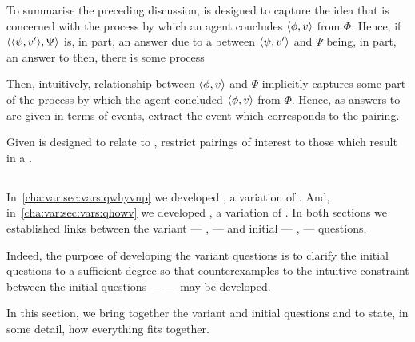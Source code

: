 \begin{note}
  To summarise the preceding discussion, \linkH{} is designed to capture the idea that \qHow{} is concerned with the process by which an agent concludes \(\langle \phi, v \rangle\) from \(\Phi\).
  Hence, if \(\langle \langle \psi, v' \rangle, \Psi \rangle\) is, in part, an answer \qHow{} due to a \ros{} between \(\langle \psi, v' \rangle\) and \(\Psi\) being, in part, an answer to \qWhyV{} then, there is some process 


  Then, intuitively, relationship between \(\langle \phi, v \rangle\) and \(\Psi\) implicitly captures some part of the process by which the agent concluded \(\langle \phi, v \rangle\) from \(\Phi\).
  Hence, as answers to \qHowV{} are given in terms of events, extract the event which corresponds to the pairing.

  Given \qHowV{} is designed to relate to \qWhyV{}, restrict pairings of interest to those which result in a .
\end{note}

\subsection{\issueConstraint{}}
\label{cha:var:sec:vars:issue}

\begin{note}
  In~\autoref{cha:var:sec:vars:qwhyvnp} we developed \qWhyV{}, a variation of \qWhy{}.
  And, in~\autoref{cha:var:sec:vars:qhowv} we developed \qHowV{}, a variation of \qHow{}.
  In both sections we established links between the variant --- \qWhyV{}, \qHowV{}  --- and initial --- \qWhy{}, \qHow{} --- questions.

  Indeed, the purpose of developing the variant questions is to clarify the initial questions to a sufficient degree so that counterexamples to the intuitive constraint between the initial questions --- \issueInclusion{} --- may be developed.

  In this section, we bring together the variant and initial questions and \issueInclusion{} to state, in some detail, how everything fits together.
\end{note}

